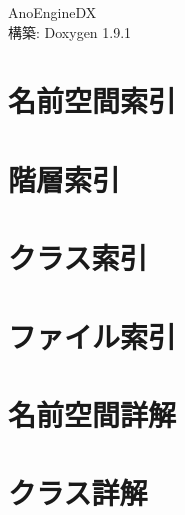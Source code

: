 \let\mypdfximage\pdfximage\def\pdfximage{\immediate\mypdfximage}\documentclass[twoside]{book}
\newcommand{\+}{\discretionary{\mbox{\scriptsize$\hookleftarrow$}}{}{}}
\newcommand{\clearemptydoublepage}{%
  \newpage{\pagestyle{empty}\cleardoublepage}%
}
\begin{document}
\raggedbottom
\begin{CJK}{UTF8}{min}

\hypersetup{pageanchor=false,
             bookmarksnumbered=true,
             pdfencoding=unicode
            }
\begin{titlepage}
\vspace*{7cm}
\begin{center}%
{\Large Ano\+Engine\+DX }\\
\vspace*{1cm}
{\large 構築\+: Doxygen 1.9.1}\\
\end{center}
\end{titlepage}
\clearemptydoublepage
{}
\tableofcontents
\clearemptydoublepage
{}
\hypersetup{pageanchor=true}

\chapter{名前空間索引}

\chapter{階層索引}

\chapter{クラス索引}

\chapter{ファイル索引}

\chapter{名前空間詳解}


\chapter{クラス詳解}































\end{CJK}
\end{document}
